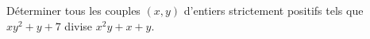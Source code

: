 Déterminer tous les couples $(x, y)$ d'entiers strictement positifs tels que $xy^{2}+y+7$ divise $x^{2}y+x+y$.
